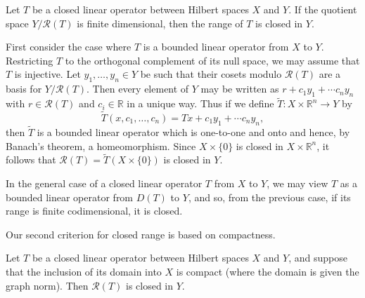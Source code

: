 \begin{Theorem}\label{thm:finite-codimension-closed-range}
{Let $T$ be a closed linear operator between Hilbert spaces $X$ and $Y$. If the quotient space $Y/\mathcal R(T)$ is finite dimensional, then the range of $T$ is closed in $Y$.}
\end{Theorem}

\begin{Proof}
{First consider the case where $T$ is a bounded linear operator from $X$ to $Y$. Restricting $T$ to the orthogonal complement of its null space, we may assume that $T$ is injective. Let $y_1,\ldots,y_n\in Y$ be such that their cosets modulo $\mathcal R(T)$ are a basis for $Y/\mathcal R(T)$. Then every element of $Y$ may be written as $r+c_1y_1+\cdots c_ny_n$ with $r\in\mathcal R(T)$ and $c_i\in\mathbb R$ in a unique way. Thus if we define $\widetilde T:X\times\mathbb R^n\to Y$ by}
\[
\widetilde T(x,c_1,\ldots,c_n)=Tx+c_1y_1+\cdots c_ny_n,
\]
{then $\widetilde T$ is a bounded linear operator which is one-to-one and onto and hence, by Banach's theorem, a homeomorphism. Since $X\times\{0\}$ is closed in $X\times\mathbb R^n$, it follows that $\mathcal R(T)=\widetilde T(X\times\{0\})$ is closed in $Y$.}

{In the general case of a closed linear operator $T$ from $X$ to $Y$, we may view $T$ as a bounded linear operator from $D(T)$ to $Y$, and so, from the previous case, if its range is finite codimensional, it is closed.}
\end{Proof}

{Our second criterion for closed range is based on compactness.}

\begin{Theorem}\label{thm:compact-domain-closed-range}
{Let $T$ be a closed linear operator between Hilbert spaces $X$ and $Y$, and suppose that the inclusion of its domain into $X$ is compact (where the domain is given the graph norm). Then $\mathcal R(T)$ is closed in $Y$.}
\end{Theorem}

